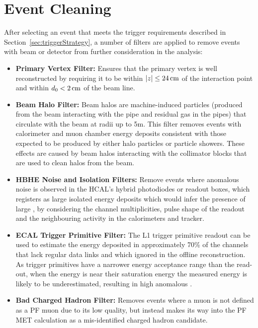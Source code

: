 \section{Event Cleaning}\label{sec:metFilters}
After selecting an event that meets the trigger requirements described in Section~\ref{sec:triggerStrategy}, a number of filters are applied to remove events with beam or detector from further consideration in the analysis:

\begin{itemize}
\item \textbf{Primary Vertex Filter:} Ensures that the primary vertex is well reconstructed by requiring it to be within $|z| \leq 24\,\text{cm}$ of the interaction point and within $d_{0} < 2\,\text{cm}$ of the beam line.
\item \textbf{Beam Halo Filter:} Beam halos are machine-induced particles (\ie produced from the beam interacting with the pipe and residual gas in the pipes) that circulate with the beam at radii up to 5m. This filter removes events with calorimeter and muon chamber energy deposits consistent with those expected to be produced by either halo particles or particle showers.
These effects are caused by beam halos interacting with the collimator blocks that are used to clean halos from the beam.
\item \textbf{HBHE Noise and Isolation Filters:} Remove events where anomalous noise is observed in the HCAL's hybrid photodiodes or readout boxes, which registers as large isolated energy deposits which would infer the presence of large \MET, by considering the channel multiplicities, pulse shape of the readout and the neighbouring activity in the calorimeters and tracker.
\item \textbf{ECAL Trigger Primitive Filter:} The L1 trigger primitive readout can be used to estimate the energy deposited in approximately 70\% of the channels that lack regular data links and which ignored in the offline reconstruction. As trigger primitives have a narrower energy acceptance range than the read-out, when the energy is near their saturation energy the measured energy is likely to be underestimated, resulting in high anomalous \MET. 
\item \textbf{Bad Charged Hadron Filter:} Removes events where a muon is not defined as a PF muon due to its low quality, but instead makes its way into the PF MET calculation as a mis-identified charged hadron candidate.
\end{itemize}

